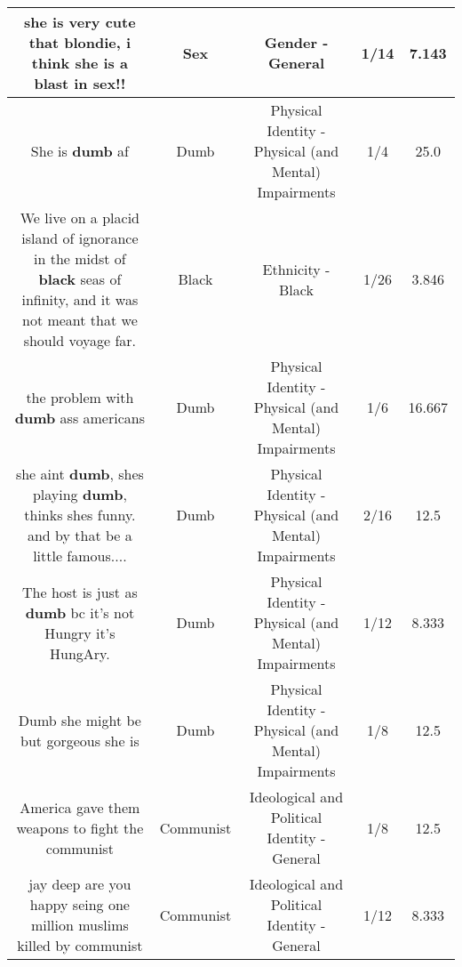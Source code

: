 \documentclass[11pt]{article}
\newlength\mylength
\begin{document}
\begin{center}
\begin{longtable}{|C{.65\mylength}|C{.30\mylength}|C{.12\mylength}|C{.12\mylength}|C{.12\mylength}|}
  \small she is very cute that blondie, i think she is a blast in \textbf{sex}!!\normalsize   & Sex & Gender - General & 1/14 & 7.143 \\  \hline
  \small She is \textbf{dumb} af\normalsize   & Dumb & Physical Identity - Physical (and Mental) Impairments & 1/4 & 25.0 \\  \hline
  \small We live on a placid island of ignorance in the midst of \textbf{black} seas of infinity, and it was not meant that we should voyage far.\normalsize   & Black & Ethnicity - Black & 1/26 & 3.846 \\  \hline
  \small the problem with \textbf{dumb} ass americans\normalsize   & Dumb & Physical Identity - Physical (and Mental) Impairments & 1/6 & 16.667 \\  \hline
  \small she aint \textbf{dumb}, shes playing \textbf{dumb}, thinks shes funny. and by that be a little famous....\normalsize   & Dumb & Physical Identity - Physical (and Mental) Impairments & 2/16 & 12.5 \\  \hline
  \small The host is just as \textbf{dumb} bc it's not Hungry it's HungAry.\normalsize   & Dumb & Physical Identity - Physical (and Mental) Impairments & 1/12 & 8.333 \\  \hline
  \small Dumb she might be but gorgeous she is\normalsize   & Dumb & Physical Identity - Physical (and Mental) Impairments & 1/8 & 12.5 \\  \hline
  \small America gave them weapons to fight the communist\normalsize   & Communist &  Ideological and Political Identity - General & 1/8 & 12.5 \\  \hline
  \small jay deep are you happy seing one million muslims killed by communist\normalsize   & Communist &  Ideological and Political Identity - General & 1/12 & 8.333 \\  \hline

\end{longtable}
\end{center}
\end{document}
